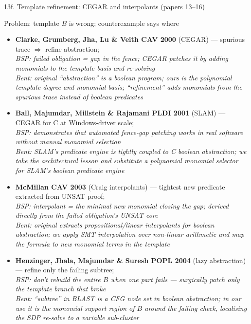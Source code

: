 \documentclass[aspectratio=169]{beamer}
\begin{document}
\begin{frame}[shrink=44]{13f. Template refinement: CEGAR and interpolants (papers 13--16)}
\begin{block}{Problem: template \(B\) is wrong; counterexample says where}
\end{block}
\begin{itemize}
  \item \textbf{Clarke, Grumberg, Jha, Lu \& Veith CAV 2000} (CEGAR) --- spurious trace \(\Rightarrow\) refine abstraction;\\
    \textcolor{blue!75!black}{\textit{BSP: failed obligation = gap in the fence; CEGAR patches it by adding monomials to the template basis and re-solving}}\\
    \textcolor{orange!80!black}{\textit{Bent: original ``abstraction'' is a boolean program; ours is the polynomial template degree and monomial basis; ``refinement'' adds monomials from the spurious trace instead of boolean predicates}}
  \item \textbf{Ball, Majumdar, Millstein \& Rajamani PLDI 2001} (SLAM) --- CEGAR for C at Windows-driver scale;\\
    \textcolor{blue!75!black}{\textit{BSP: demonstrates that automated fence-gap patching works in real software without manual monomial selection}}\\
    \textcolor{orange!80!black}{\textit{Bent: SLAM's predicate engine is tightly coupled to C boolean abstraction; we take the \emph{architectural} lesson and substitute a polynomial monomial selector for SLAM's boolean predicate engine}}
  \item \textbf{McMillan CAV 2003} (Craig interpolants) --- tightest new predicate extracted from UNSAT proof;\\
    \textcolor{blue!75!black}{\textit{BSP: interpolant = the minimal new monomial closing the gap; derived directly from the failed obligation's UNSAT core}}\\
    \textcolor{orange!80!black}{\textit{Bent: original extracts propositional/linear interpolants for boolean abstraction; we apply SMT interpolation over non-linear arithmetic and map the formula to new monomial terms in the template}}
  \item \textbf{Henzinger, Jhala, Majumdar \& Suresh POPL 2004} (lazy abstraction) --- refine only the failing subtree;\\
    \textcolor{blue!75!black}{\textit{BSP: don't rebuild the entire \(B\) when one part fails --- surgically patch only the template branch that broke}}\\
    \textcolor{orange!80!black}{\textit{Bent: ``subtree'' in BLAST is a CFG node set in boolean abstraction; in our use it is the monomial support region of \(B\) around the failing check, localising the SDP re-solve to a variable sub-cluster}}
\end{itemize}
\end{frame}
\end{document}
